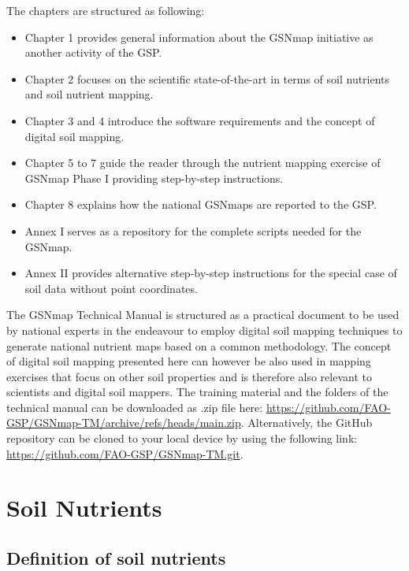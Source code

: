 \documentclass[
  10pt,
  b5paper,
  oneside]{book}
\providecommand{\tightlist}{%
  \setlength{\itemsep}{0pt}\setlength{\parskip}{0pt}}
\begin{document}
The chapters are structured as following:

\begin{itemize}
\tightlist
\item
  Chapter 1 provides general information about the GSNmap initiative as another activity of the GSP.
\item
  Chapter 2 focuses on the scientific state-of-the-art in terms of soil nutrients and soil nutrient mapping.
\item
  Chapter 3 and 4 introduce the software requirements and the concept of digital soil mapping.
\item
  Chapter 5 to 7 guide the reader through the nutrient mapping exercise of GSNmap Phase I providing step-by-step instructions.
\item
  Chapter 8 explains how the national GSNmaps are reported to the GSP.
\item
  Annex I serves as a repository for the complete scripts needed for the GSNmap.
\item
  Annex II provides alternative step-by-step instructions for the special case of soil data without point coordinates.
\end{itemize}

The GSNmap Technical Manual is structured as a practical document to be used by national experts in the endeavour to employ digital soil mapping techniques to generate national nutrient maps based on a common methodology. The concept of digital soil mapping presented here can however be also used in mapping exercises that focus on other soil properties and is therefore also relevant to scientists and digital soil mappers. The training material and the folders of the technical manual can be downloaded as .zip file here: \url{https://github.com/FAO-GSP/GSNmap-TM/archive/refs/heads/main.zip}. Alternatively, the GitHub repository can be cloned to your local device by using the following link: \url{https://github.com/FAO-GSP/GSNmap-TM.git}.

\hypertarget{soil-nutrients}{%
\chapter{Soil Nutrients}\label{soil-nutrients}}

\hypertarget{definition-of-soil-nutrients}{%
\section{Definition of soil nutrients}\label{definition-of-soil-nutrients}}
\end{document}
